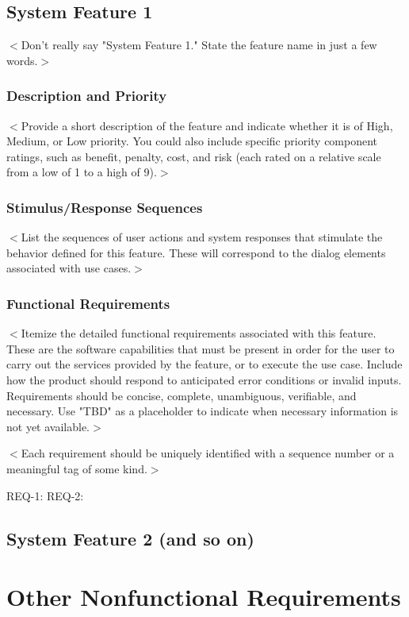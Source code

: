 \documentclass[a4paper, 11pt]{scrreprt}
\begin{document}
\section{System Feature 1}
$<$Don't really say "System Feature 1." State the feature name in just a few 
words.$>$

\subsection{Description and Priority}
$<$Provide a short description of the feature and indicate whether it is of 
High, Medium, or Low priority. You could also include specific priority 
component ratings, such as benefit, penalty, cost, and risk (each rated on a 
relative scale from a low of 1 to a high of 9).$>$

\subsection{Stimulus/Response Sequences}
$<$List the sequences of user actions and system responses that stimulate the 
behavior defined for this feature. These will correspond to the dialog elements 
associated with use cases.$>$

\subsection{Functional Requirements}
$<$Itemize the detailed functional requirements associated with this feature.  
These are the software capabilities that must be present in order for the user 
to carry out the services provided by the feature, or to execute the use case.  
Include how the product should respond to anticipated error conditions or 
invalid inputs. Requirements should be concise, complete, unambiguous, 
verifiable, and necessary. Use "TBD" as a placeholder to indicate when necessary 
information is not yet available.$>$

$<$Each requirement should be uniquely identified with a sequence number or a 
meaningful tag of some kind.$>$

REQ-1:	REQ-2:

\section{System Feature 2 (and so on)}


\chapter{Other Nonfunctional Requirements}
\end{document}
